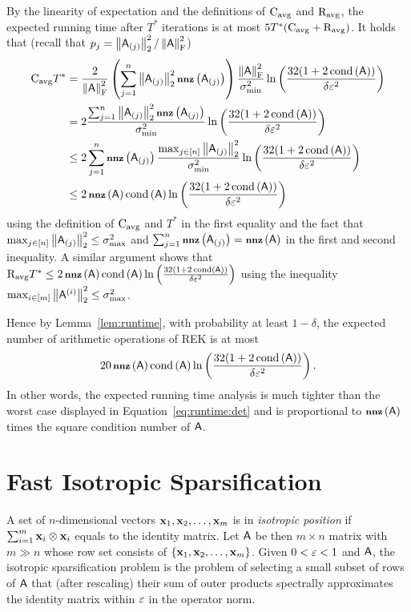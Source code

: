 By the linearity of expectation and the definitions of $\cavg$ and $\ravg$, the expected running time after $T^*$ iterations is at most $5T^* (\cavg + \ravg)$. It holds that (recall that $p_j = \norm{\ac{j}}^2/\frobnorm{\matA}^2$)
\begin{align*}
	\cavg T^* & =  \frac{2}{\frobnorm{\matA}^2}\left(\sum_{j=1}^{n} \norm{\ac{j}}^2 \nnz{\ac{j}}\right)\frac{\frobnorm{\matA}^2}{\sigma_{\min}^2}\ln \left(\frac{32(1+2\cond{\matA})}{\delta\eps^2}\right)\\
			  & =  2\frac{\sum_{j=1}^{n} \norm{\ac{j}}^2 \nnz{\ac{j}}}{\sigma_{\min}^2}\ln \left(\frac{32(1+2\cond{\matA})}{\delta\eps^2}\right)\\
			  & \leq 2\sum_{j=1}^{n}\nnz{\ac{j}}\frac{\max_{j\in{[n]}} \norm{\ac{j}}^2}{\sigma_{\min}^2} \ln \left(\frac{32(1+2\cond{\matA})}{\delta\eps^2}\right)\\
			& \leq 2\nnz{\matA}\cond{\matA} \ln \left(\frac{32(1+2\cond{\matA})}{\delta\eps^2}\right)
\end{align*}
using the definition of $\cavg$ and $T^*$ in the first equality and the fact that $\max_{j\in{[n]}} \norm{\ac{j}}^2 \leq \sigma_{\max}^2$ and $\sum_{j=1}^{n}\nnz{\ac{j}} = \nnz{\matA}$ in the first and second inequality. A similar argument shows that $\ravg T^* \leq 2\nnz{\matA} \cond{\matA} \ln \left(\frac{32(1+2\cond{\matA})}{\delta\eps^2}\right)$ using the inequality $\max_{i\in{[m]}} \norm{\ar{i}}^2 \leq \sigma_{\max}^2$.
%

%
Hence by Lemma~\ref{lem:runtime}, with probability at least $1-\delta$, the expected number of arithmetic operations of REK is at most
\begin{equation}\label{eq:runtime:rand}
 20 \nnz{\matA} \cond{\matA}\ln \left(\frac{32(1+2\cond{\matA})}{\delta\eps^2}\right).
\end{equation}
In other words, the expected running time analysis is much tighter than the worst case displayed in Equation~\eqref{eq:runtime:det} and is proportional to $\nnz{\matA}$ times the square condition number of $\matA$.
%
%
%
\section{Fast Isotropic Sparsification}\label{sec:fast_isotrop_sparse}
A set of $n$-dimensional vectors $\x_1,\x_2, \ldots , \x_m$ is in \emph{isotropic position} if $\sum_{i=1}^{m} \x_i\otimes \x_i $ equals to the identity matrix. Let $\matA$ be then $m\times n$ matrix with $m\gg n$ whose row set consists of $\{\x_1,\x_2,\ldots ,\x_m\}$. Given $0 <\eps < 1$ and $\matA$, the isotropic sparsification problem is the problem of selecting a small subset of rows of $\matA$ that (after rescaling) their sum of outer products spectrally approximates the identity matrix within $\eps$ in the operator norm.
%

